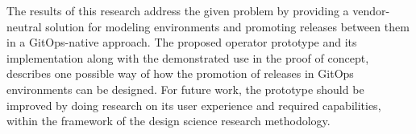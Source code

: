 The results of this research
address the given problem
by providing a vendor-neutral solution
for modeling environments and promoting releases between them
in a GitOps-native approach.
The proposed operator prototype and its implementation along with
the demonstrated use in the proof of concept,
describes one possible way of how the promotion of releases
in GitOps environments can be designed.
For future work, the prototype should be improved
by doing research on its user experience and required capabilities,
within the framework of
the design science research methodology.























